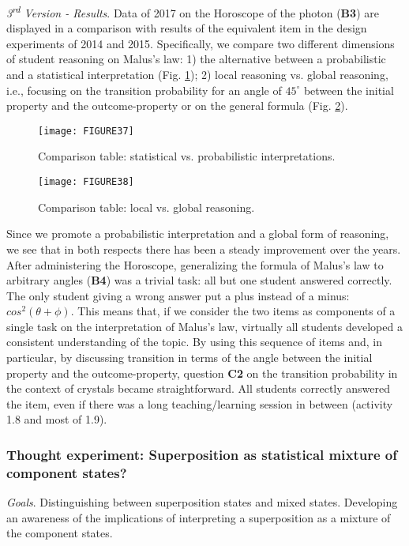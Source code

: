 \documentclass[twocolumn,secnumarabic,amssymb, nobibnotes, aps, prd, nofootinbib]{revtex4-2}
\begin{document}
\emph{3\textsuperscript{rd} Version - Results}. Data of 2017 on the Horoscope of the photon (\textbf{B3}) are displayed in a comparison with results of the equivalent item in the design experiments of 2014 and 2015.
Specifically, we compare two different dimensions of student reasoning on Malus's law: 1) the alternative between a probabilistic and a statistical interpretation (Fig. \ref{FIG:37}); 2) local reasoning vs. global reasoning, i.e., focusing on the transition probability for an angle of $45^{\circ}$ between the initial property and the outcome-property or on the general formula (Fig. \ref{FIG:38}).
\begin{figure}[!htpb]
    \texttt{[image: FIGURE37]}
    \caption{Comparison table: statistical vs. probabilistic interpretations.}
    \label{FIG:37}
\end{figure}
\begin{figure}[!htpb]
    \texttt{[image: FIGURE38]}
    \caption{Comparison table: local vs. global reasoning.}
    \label{FIG:38}
\end{figure}
Since we promote a probabilistic interpretation and a global form of reasoning, we see that in both respects there has been a steady improvement over the years. After administering the Horoscope, generalizing the formula of Malus's law to arbitrary angles (\textbf{B4}) was a trivial task: all but one student answered correctly. The only student giving a wrong answer put a plus instead of a minus: $cos^2(\theta+\phi)$. This means that, if we consider the two items as components of a single task on the interpretation of Malus's law, virtually all students developed a consistent understanding of the topic. By using this sequence of items and, in particular, by discussing transition in terms of the angle between the initial property and the outcome-property, question \textbf{C2} on the transition probability in the context of crystals became straightforward. All students correctly answered the item, even if there was a long teaching/learning session in between (activity 1.8 and most of 1.9).


\subsubsection{Thought experiment: Superposition as statistical mixture of component states?} \label{Sec:5.4.3}

\emph{Goals}. Distinguishing between superposition states and mixed states. Developing an awareness of the implications of interpreting a superposition as a mixture of the component states.
\end{document}
